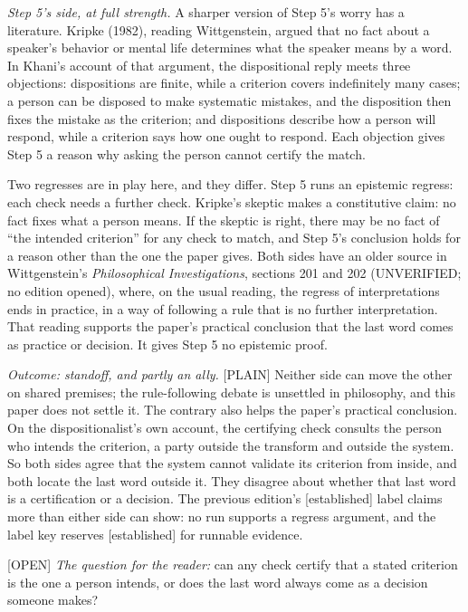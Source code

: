 \documentclass[11pt]{article}
\newcommand{\register}[1]{{\ttfamily\small #1}}
\begin{document}
\emph{Step 5's side, at full strength.} A sharper version of Step 5's worry has a literature. Kripke (1982), reading Wittgenstein, argued that no fact about a speaker's behavior or mental life determines what the speaker means by a word. In Khani's account of that argument, the dispositional reply meets three objections: dispositions are finite, while a criterion covers indefinitely many cases; a person can be disposed to make systematic mistakes, and the disposition then fixes the mistake as the criterion; and dispositions describe how a person will respond, while a criterion says how one ought to respond. Each objection gives Step 5 a reason why asking the person cannot certify the match.

Two regresses are in play here, and they differ. Step 5 runs an epistemic regress: each check needs a further check. Kripke's skeptic makes a constitutive claim: no fact fixes what a person means. If the skeptic is right, there may be no fact of ``the intended criterion'' for any check to match, and Step 5's conclusion holds for a reason other than the one the paper gives. Both sides have an older source in Wittgenstein's \emph{Philosophical Investigations}, sections 201 and 202 (UNVERIFIED; no edition opened), where, on the usual reading, the regress of interpretations ends in practice, in a way of following a rule that is no further interpretation. That reading supports the paper's practical conclusion that the last word comes as practice or decision. It gives Step 5 no epistemic proof.

\emph{Outcome: standoff, and partly an ally.} \register{[PLAIN]} Neither side can move the other on shared premises; the rule-following debate is unsettled in philosophy, and this paper does not settle it. The contrary also helps the paper's practical conclusion. On the dispositionalist's own account, the certifying check consults the person who intends the criterion, a party outside the transform and outside the system. So both sides agree that the system cannot validate its criterion from inside, and both locate the last word outside it. They disagree about whether that last word is a certification or a decision. The previous edition's [established] label claims more than either side can show: no run supports a regress argument, and the label key reserves [established] for runnable evidence.

\register{[OPEN]} \emph{The question for the reader:} can any check certify that a stated criterion is the one a person intends, or does the last word always come as a decision someone makes?
\end{document}
